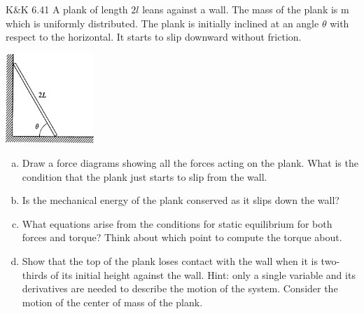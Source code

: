 \documentclass{esg8012pset}
\begin{document}
\begin{problem}{K\&K 6.41}
  A plank of length $2 l$ leans against a wall. The mass of the plank is m which is uniformly distributed. The plank is initially inclined at an angle $\theta$ with respect to the horizontal. It starts to slip downward without friction.
  \begin{center}\includegraphics[width=0.25\textwidth]{ps09_7}\end{center}
  \begin{enumerate}[(a)]
    \item Draw a force diagrams showing all the forces acting on the plank. What is the condition that the plank just starts to slip from the wall.
    \item Is the mechanical energy of the plank conserved as it slips down the wall?
    \item What equations arise from the conditions for static equilibrium for both forces and torque? Think about which point to compute the torque about.
    \item Show that the top of the plank loses contact with the wall when it is two-thirds of its initial height against the wall. Hint: only a single variable and its derivatives are needed to describe the motion of the system. Consider the motion of the center of mass of the plank.
  \end{enumerate}
\end{problem}
\end{document}
